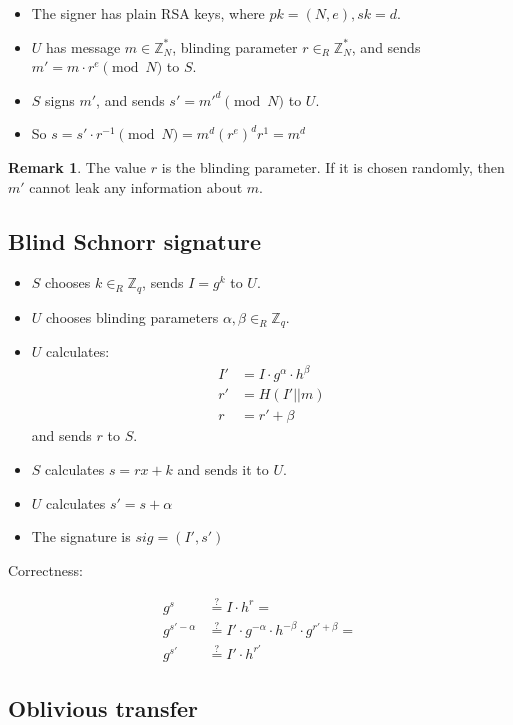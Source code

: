 \documentclass[11pt]{article}
\theoremstyle{definition}
\newtheorem{remark}{Remark}[section]
\theoremstyle{proof}
\begin{document}
\begin{itemize}
	\item The signer has plain RSA keys, where $pk = (N, e), sk = d$.
	\item $U$ has message $m \in \mathbb{Z}_N^*$, blinding parameter $r \in_R \mathbb{Z}_N^*$, and sends $m' = m \cdot r^e \pmod{N}$ to $S$.
	\item $S$ signs $m'$, and sends $s' = m'^d \pmod{N}$ to $U$.
	\item So $s = s' \cdot r^{-1} \pmod{N} = m^d (r^e)^d r^{1} = m^d$
\end{itemize}

\begin{remark}
	The value $r$ is the blinding parameter. If it is chosen randomly, then $m'$ cannot leak any information about $m$.
\end{remark}

\subsection{Blind Schnorr signature}

\begin{itemize}
	\item $S$ chooses $k \in_R \mathbb{Z}_q$, sends $I=g^k$ to $U$.
	\item $U$ chooses blinding parameters $\alpha, \beta \in_R \mathbb{Z}_q$.
	\item $U$ calculates:
	\begin{align}
		I' &= I \cdot g^\alpha \cdot h^\beta \\
		r' &= H(I' || m) \\
		r &= r' + \beta
	\end{align}
	and sends $r$ to $S$.
	\item $S$ calculates $s = rx + k$ and sends it to $U$.
	\item $U$ calculates $s' = s + \alpha$
	\item The signature is $sig = (I', s')$
\end{itemize}

Correctness:

\begin{align}
	g^s &\stackrel{?}{=} I \cdot h^r = \\
	g^{s'-\alpha} &\stackrel{?}{=} I' \cdot g^{-\alpha} \cdot h^{-\beta} \cdot g^{r' + \beta} = \\
	g^{s'} &\stackrel{?}{=} I' \cdot h^{r'}
\end{align}

\subsection{Oblivious transfer}
\end{document}
